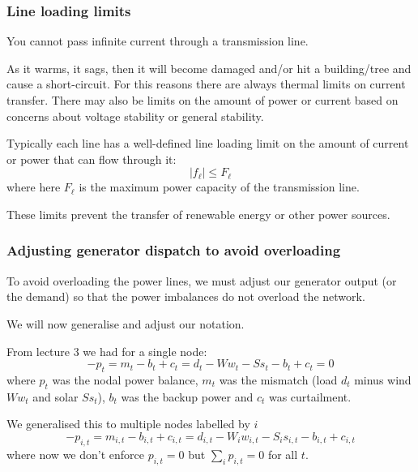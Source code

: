 \documentclass[10pt,aspectratio=169,dvipsnames]{beamer}
\begin{document}
\begin{frame}
  \frametitle{Line loading limits}

  You cannot pass infinite current through a transmission line.

  As it warms, it sags, then it will become damaged and/or hit a
  building/tree and cause a short-circuit. For this reasons there are
  always \alert{thermal limits} on current transfer. There may also be
  limits on the amount of power or current based on concerns about
  \alert{voltage stability} or \alert{general stability}.

  Typically each line has a well-defined \alert{line loading limit} on the
  amount of current or power that can flow through it:
  \begin{equation*}
    | f_{\ell } | \leq F_\ell
  \end{equation*}
  where here $F_\ell$ is the maximum power capacity of the transmission line.

  These limits prevent the transfer of renewable energy or other power sources.

\end{frame}




\begin{frame}
  \frametitle{Adjusting generator dispatch to avoid overloading}

  To avoid overloading the power lines, we must adjust our generator
  output (or the demand) so that the power imbalances do not overload
  the network.

  We will now generalise and adjust our notation.

  From lecture 3 we had for a single node:
  \begin{equation*}
    - p_t = m_t -b_t + c_t = d_t - Ww_t - Ss_t -b_t + c_t = 0
  \end{equation*}
  where $p_t$ was the nodal power balance, $m_t$ was the mismatch
  (load $d_t$ minus wind $Ww_t$ and solar $Ss_t$), $b_t$ was the
  backup power and $c_t$ was curtailment.

  We generalised this to multiple nodes labelled by $i$
  \begin{equation*}
    - p_{i,t} = m_{i,t} -b_{i,t} + c_{i,t} = d_{i,t} - W_iw_{i,t} - S_is_{i,t} -b_{i,t} + c_{i,t}
  \end{equation*}
  where now we don't enforce $p_{i,t} = 0$ but $\sum_{i} p_{i,t} = 0$ for
  all $t$.

\end{frame}
\end{document}
